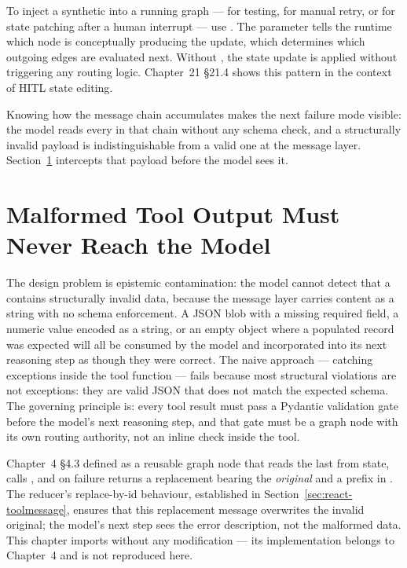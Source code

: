 \begin{notebox}
To inject a synthetic  into a running graph --- for
testing, for manual retry, or for state patching after a human interrupt
--- use . The  parameter tells the runtime which
node is conceptually producing the update, which determines which outgoing
edges are evaluated next. Without , the state update is
applied without triggering any routing logic. Chapter~21 \S21.4 shows
this pattern in the context of HITL state editing.
\end{notebox}

Knowing how the message chain accumulates makes the next failure mode
visible: the model reads every  in that chain without
any schema check, and a structurally invalid payload is indistinguishable
from a valid one at the message layer. Section~\ref{sec:react-validation}
intercepts that payload before the model sees it.


\section{Malformed Tool Output Must Never Reach the Model}
\label{sec:react-validation}

The design problem is epistemic contamination: the model cannot detect
that a  contains structurally invalid data, because the
message layer carries content as a string with no schema enforcement.
A JSON blob with a missing required field, a numeric value encoded as a
string, or an empty object where a populated record was expected will all
be consumed by the model and incorporated into its next reasoning step
as though they were correct. The naive approach --- catching exceptions
inside the tool function --- fails because most structural violations are
not exceptions: they are valid JSON that does not match the expected schema.
The governing principle is: every tool result must pass a Pydantic
validation gate before the model's next reasoning step, and that gate must
be a graph node with its own routing authority, not an inline check inside
the tool.

Chapter~4 \S4.3 defined  as a reusable graph node
that reads the last  from state, calls
, and on failure
returns a replacement  bearing the \emph{original}
 and a  prefix in
. The  reducer's replace-by-id behaviour,
established in Section~\ref{sec:react-toolmessage}, ensures that this
replacement message overwrites the invalid original; the model's next step
sees the error description, not the malformed data. This chapter imports
 without any modification --- its implementation
belongs to Chapter~4 and is not reproduced here.

